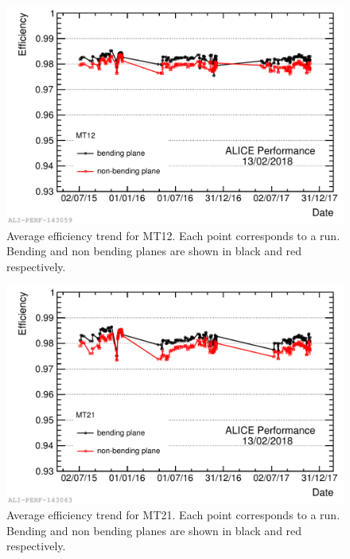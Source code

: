 \begin{figure}[!ht]
\begin{center}
\includegraphics[width=0.8\linewidth]{Chapters/Performance/Figs/2018-Feb-16-effTrend_2015-2017_Ch12.pdf}
\caption{Average efficiency trend for MT12. Each point corresponds to a run. Bending and non bending planes are shown in black and red respectively.}
\label{fig:MTR12efficiency}
\end{center}
\end{figure}

\begin{figure}[!hb]
\begin{center}
\includegraphics[width=0.8\linewidth]{Chapters/Performance/Figs/2018-Feb-16-effTrend_2015-2017_Ch13.pdf}
\caption{Average efficiency trend for MT21. Each point corresponds to a run. Bending and non bending planes are shown in black and red respectively.}
\label{fig:MTR21efficiency}
\end{center}
\end{figure}

